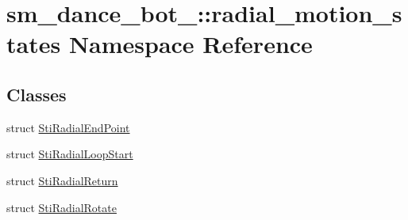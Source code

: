 \hypertarget{namespacesm__dance__bot__2_1_1radial__motion__states}{}\section{sm\+\_\+dance\+\_\+bot\+\_\+:\+:radial\+\_\+motion\+\_\+states Namespace Reference}
\label{namespacesm__dance__bot__2_1_1radial__motion__states}
\subsection*{Classes}
\begin{DoxyCompactItemize}
\item 
struct \hyperlink{structsm__dance__bot__2_1_1radial__motion__states_1_1StiRadialEndPoint}{Sti\+Radial\+End\+Point}
\item 
struct \hyperlink{structsm__dance__bot__2_1_1radial__motion__states_1_1StiRadialLoopStart}{Sti\+Radial\+Loop\+Start}
\item 
struct \hyperlink{structsm__dance__bot__2_1_1radial__motion__states_1_1StiRadialReturn}{Sti\+Radial\+Return}
\item 
struct \hyperlink{structsm__dance__bot__2_1_1radial__motion__states_1_1StiRadialRotate}{Sti\+Radial\+Rotate}
\end{DoxyCompactItemize}
